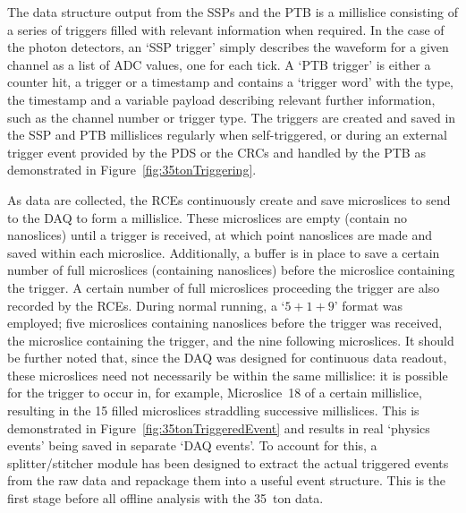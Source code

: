 The data structure output from the SSPs and the PTB is a millislice consisting of a series of triggers filled with relevant information when required.  In the case of the photon detectors, an `SSP trigger' simply describes the waveform for a given channel as a list of ADC values, one for each tick.  A `PTB trigger' is either a counter hit, a trigger or a timestamp and contains a `trigger word' with the type, the timestamp and a variable payload describing relevant further information, such as the channel number or trigger type.  The triggers are created and saved in the SSP and PTB millislices regularly when self-triggered, or during an external trigger event provided by the PDS or the CRCs and handled by the PTB as demonstrated in Figure~\ref{fig:35tonTriggering}.

As data are collected, the RCEs continuously create and save microslices to send to the DAQ to form a millislice.  These microslices are empty (contain no nanoslices) until a trigger is received, at which point nanoslices are made and saved within each microslice.  Additionally, a buffer is in place to save a certain number of full microslices (containing nanoslices) before the microslice containing the trigger.  A certain number of full microslices proceeding the trigger are also recorded by the RCEs.  During normal running, a `$5+1+9$' format was employed; five microslices containing nanoslices before the trigger was received, the microslice containing the trigger, and the nine following microslices.  It should be further noted that, since the DAQ was designed for continuous data readout, these microslices need not necessarily be within the same millislice: it is possible for the trigger to occur in, for example, Microslice~18 of a certain millislice, resulting in the 15 filled microslices straddling successive millislices.  This is demonstrated in Figure~\ref{fig:35tonTriggeredEvent} and results in real `physics events' being saved in separate `DAQ events'.  To account for this, a splitter/stitcher module has been designed to extract the actual triggered events from the raw data and repackage them into a useful event structure.  This is the first stage before all offline analysis with the 35~ton data.

